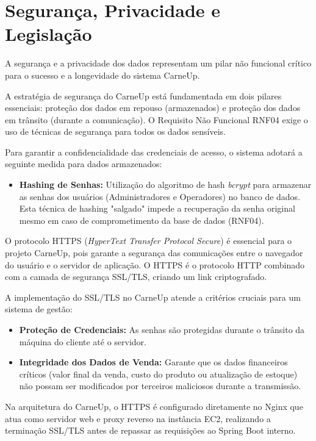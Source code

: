 \documentclass[
	12pt,				%
	openany,			%
	oneside,			%
	a4paper,			%
	english,			%
	french,				%
	spanish,			%
	brazil				%
	]{abntex2}
\begin{document}
\section{Segurança, Privacidade e Legislação}

A segurança e a privacidade dos dados representam um pilar não funcional crítico para o sucesso e a longevidade do sistema CarneUp.

A estratégia de segurança do CarneUp está fundamentada em dois pilares essenciais: proteção dos dados em repouso (armazenados) e proteção dos dados em trânsito (durante a comunicação). O Requisito Não Funcional RNF04 exige o uso de técnicas de segurança para todos os dados sensíveis.

Para garantir a confidencialidade das credenciais de acesso, o sistema adotará a seguinte medida para dados armazenados:

\begin{itemize}
    \item \textbf{Hashing de Senhas:} Utilização do algoritmo de hash \textit{bcrypt} para armazenar as senhas dos usuários (Administradores e Operadores) no banco de dados. Esta técnica de hashing "salgado" impede a recuperação da senha original mesmo em caso de comprometimento da base de dados (RNF04).
\end{itemize}

O protocolo HTTPS (\textit{HyperText Transfer Protocol Secure}) é essencial para o projeto CarneUp, pois garante a segurança das comunicações entre o navegador do usuário e o servidor de aplicação. O HTTPS é o protocolo HTTP combinado com a camada de segurança SSL/TLS, criando um link criptografado.

A implementação do SSL/TLS no CarneUp atende a critérios cruciais para um sistema de gestão:
\begin{itemize}
    \item \textbf{Proteção de Credenciais:} As senhas são protegidas durante o trânsito da máquina do cliente até o servidor.
    \item \textbf{Integridade dos Dados de Venda:} Garante que os dados financeiros críticos (valor final da venda, custo do produto ou atualização de estoque) não possam ser modificados por terceiros maliciosos durante a transmissão.
\end{itemize}

Na arquitetura do CarneUp, o HTTPS é configurado diretamente no Nginx que atua como servidor web e proxy reverso na instância EC2, realizando a terminação SSL/TLS antes de repassar as requisições ao Spring Boot interno.
\end{document}
